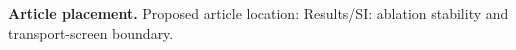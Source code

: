 \textbf{Article placement.} Proposed article location: Results/SI: ablation stability and transport-screen boundary.
